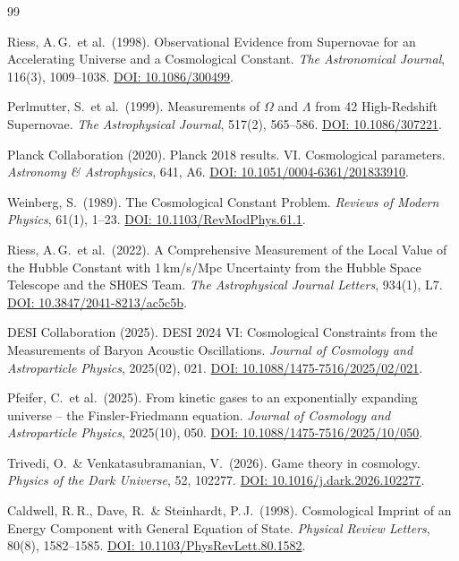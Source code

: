 \documentclass[aps,prd,twocolumn,superscriptaddress,nofootinbib]{revtex4-2}
\begin{document}
\begin{thebibliography}{99}

Riess, A.\,G.\ et al.\ (1998).
Observational Evidence from Supernovae for an Accelerating Universe and a Cosmological Constant.
\textit{The Astronomical Journal}, 116(3), 1009--1038.
\href{https://doi.org/10.1086/300499}{DOI: 10.1086/300499}.

Perlmutter, S.\ et al.\ (1999).
Measurements of $\Omega$ and $\Lambda$ from 42 High-Redshift Supernovae.
\textit{The Astrophysical Journal}, 517(2), 565--586.
\href{https://doi.org/10.1086/307221}{DOI: 10.1086/307221}.

Planck Collaboration (2020).
Planck 2018 results. VI. Cosmological parameters.
\textit{Astronomy \& Astrophysics}, 641, A6.
\href{https://doi.org/10.1051/0004-6361/201833910}{DOI: 10.1051/0004-6361/201833910}.

Weinberg, S.\ (1989).
The Cosmological Constant Problem.
\textit{Reviews of Modern Physics}, 61(1), 1--23.
\href{https://doi.org/10.1103/RevModPhys.61.1}{DOI: 10.1103/RevModPhys.61.1}.

Riess, A.\,G.\ et al.\ (2022).
A Comprehensive Measurement of the Local Value of the Hubble Constant with 1\,km/s/Mpc Uncertainty from the Hubble Space Telescope and the SH0ES Team.
\textit{The Astrophysical Journal Letters}, 934(1), L7.
\href{https://doi.org/10.3847/2041-8213/ac5c5b}{DOI: 10.3847/2041-8213/ac5c5b}.

DESI Collaboration (2025).
DESI 2024 VI: Cosmological Constraints from the Measurements of Baryon Acoustic Oscillations.
\textit{Journal of Cosmology and Astroparticle Physics}, 2025(02), 021.
\href{https://doi.org/10.1088/1475-7516/2025/02/021}{DOI: 10.1088/1475-7516/2025/02/021}.

Pfeifer, C.\ et al.\ (2025).
From kinetic gases to an exponentially expanding universe -- the Finsler-Friedmann equation.
\textit{Journal of Cosmology and Astroparticle Physics}, 2025(10), 050.
\href{https://doi.org/10.1088/1475-7516/2025/10/050}{DOI: 10.1088/1475-7516/2025/10/050}.

Trivedi, O.\ \& Venkatasubramanian, V.\ (2026).
Game theory in cosmology.
\textit{Physics of the Dark Universe}, 52, 102277.
\href{https://doi.org/10.1016/j.dark.2026.102277}{DOI: 10.1016/j.dark.2026.102277}.

Caldwell, R.\,R., Dave, R.\ \& Steinhardt, P.\,J.\ (1998).
Cosmological Imprint of an Energy Component with General Equation of State.
\textit{Physical Review Letters}, 80(8), 1582--1585.
\href{https://doi.org/10.1103/PhysRevLett.80.1582}{DOI: 10.1103/PhysRevLett.80.1582}.


\end{thebibliography}
\end{document}
